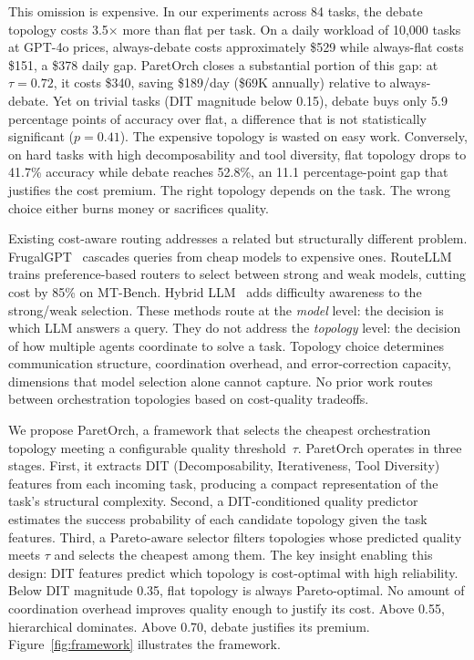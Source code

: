 \documentclass{article}
\begin{document}
This omission is expensive. In our experiments across 84 tasks, the debate topology costs 3.5$\times$ more than flat per task. On a daily workload of 10,000 tasks at GPT-4o prices, always-debate costs approximately \$529 while always-flat costs \$151, a \$378 daily gap. ParetOrch closes a substantial portion of this gap: at $\tau = 0.72$, it costs \$340, saving \$189/day (\$69K annually) relative to always-debate. Yet on trivial tasks (DIT magnitude below 0.15), debate buys only 5.9 percentage points of accuracy over flat, a difference that is not statistically significant ($p = 0.41$). The expensive topology is wasted on easy work. Conversely, on hard tasks with high decomposability and tool diversity, flat topology drops to 41.7\% accuracy while debate reaches 52.8\%, an 11.1 percentage-point gap that justifies the cost premium. The right topology depends on the task. The wrong choice either burns money or sacrifices quality.

Existing cost-aware routing addresses a related but structurally different problem. FrugalGPT~\cite{chen2023frugalgpt} cascades queries from cheap models to expensive ones. RouteLLM~\cite{ong2024routellm} trains preference-based routers to select between strong and weak models, cutting cost by 85\% on MT-Bench. Hybrid LLM~\cite{ding2024hybrid} adds difficulty awareness to the strong/weak selection. These methods route at the \emph{model} level: the decision is which LLM answers a query. They do not address the \emph{topology} level: the decision of how multiple agents coordinate to solve a task. Topology choice determines communication structure, coordination overhead, and error-correction capacity, dimensions that model selection alone cannot capture. No prior work routes between orchestration topologies based on cost-quality tradeoffs.

We propose ParetOrch, a framework that selects the cheapest orchestration topology meeting a configurable quality threshold~$\tau$. ParetOrch operates in three stages. First, it extracts DIT (Decomposability, Iterativeness, Tool Diversity) features from each incoming task, producing a compact representation of the task's structural complexity. Second, a DIT-conditioned quality predictor estimates the success probability of each candidate topology given the task features. Third, a Pareto-aware selector filters topologies whose predicted quality meets $\tau$ and selects the cheapest among them. The key insight enabling this design: DIT features predict which topology is cost-optimal with high reliability. Below DIT magnitude 0.35, flat topology is always Pareto-optimal. No amount of coordination overhead improves quality enough to justify its cost. Above 0.55, hierarchical dominates. Above 0.70, debate justifies its premium. Figure~\ref{fig:framework} illustrates the framework.
\end{document}
